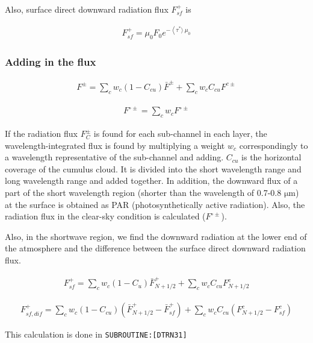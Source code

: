 Also, surface direct downward radiation flux \(F_{s f}^{+}\) is

\begin{eqnarray}
F_{s f}^{+}=\mu_{0} F_{0} e^{-\left\langle\tau^{*}\rangle\ \mu_{0}\right.}
\end{eqnarray}

\hypertarget{adding-in-the-flux}{%
\subsubsection{Adding in the flux}\label{adding-in-the-flux}}

\begin{eqnarray}
F^{\pm}=\sum_{c} w_{c}\left(1-C_{c u}\right) \bar{F}^{\pm}+\sum_{c} w_{c} C_{c u} F^{c \pm}
\end{eqnarray}

\begin{eqnarray}
F^{\circ \pm}=\sum_{c} w_{c} F^{\circ \pm}
\end{eqnarray}

If the radiation flux \(F_{C}^{\pm}\) is found for each sub-channel in
each layer, the wavelength-integrated flux is found by multiplying a
weight \(w_c\) correspondingly to a wavelength representative of the
sub-channel and adding. \(C_{cu}\) is the horizontal coverage of the
cumulus cloud. It is divided into the short wavelength range and long
wavelength range and added together. In addition, the downward flux of a
part of the short wavelength region (shorter than the wavelength of
0.7-0.8 \(\mathrm{{\mu}m}\)) at the surface is obtained as PAR
(photosynthetically active radiation). Also, the radiation flux in the
clear-sky condition is calculated (\(F^{\circ \pm}\)).

Also, in the shortwave region, we find the downward radiation at the
lower end of the atmosphere and the difference between the surface
direct downward radiation flux.

\begin{eqnarray}
F_{s f}^{+}=\sum_{c} w_{c}\left(1-C_{u}\right) \bar{F}_{N+1 / 2}^{+}+\sum_{c} w_{c} C_{c u} F_{N+1 / 2}^{c}
\end{eqnarray}

\begin{eqnarray}
F_{s f, d i f}^{+}=\sum_{c} w_{c}\left(1-C_{c u}\right)\left(\bar{F}_{N+1 / 2}^{+}-\bar{F}_{s f}^{+}\right)+\sum_{c} w_{c} C_{c u}\left(F_{N+1 / 2}^{c}-F_{s f}^{c}\right)
\end{eqnarray}

This calculation is done in \texttt{SUBROUTINE:{[}DTRN31{]}}

